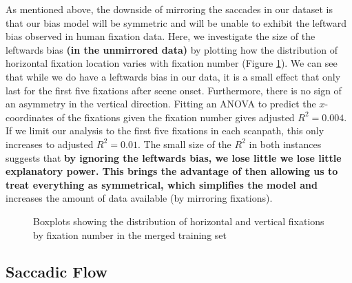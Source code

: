 \documentclass[a4paper, twocolumn, oneside, 11pt]{article}
\begin{document}
As mentioned above, the downside of mirroring the saccades in our dataset is that our bias model will be symmetric and will be unable to exhibit the leftward bias observed in human fixation data. Here, we investigate the size of the leftwards bias \textbf{(in the unmirrored data)} by plotting how the distribution of horizontal fixation location varies with fixation number (Figure \ref{fig:leftrightDist}). We can see that while we do have a leftwards bias in our data, it is a small effect that only last for the first five fixations after scene onset. Furthermore, there is no sign of an asymmetry in the vertical direction. Fitting an ANOVA to predict the $x$-coordinates of the fixations given the fixation number gives adjusted $R^2=0.004$. If we limit our analysis to the first five fixations in each scanpath, this only increases to adjusted $R^2=0.01$. The small size of the $R^2$ in both instances suggests that \textbf{by ignoring the leftwards bias, we lose little we lose little explanatory power. This brings the advantage of then allowing us to treat everything as symmetrical, which simplifies the model and} increases the amount of data available (by mirroring fixations). 

\begin{figure}
\centering
{}
\caption{Boxplots showing the distribution of horizontal and vertical fixations by fixation number in the merged training set}
\label{fig:leftrightDist}
\end{figure}


\subsection{Saccadic Flow}
\label{ModellingFlow}
\end{document}
